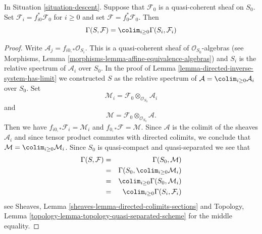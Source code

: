 \begin{lemma}
\label{lemma-descend-section}
In Situation \ref{situation-descent}.
Suppose that $\mathcal{F}_0$ is a quasi-coherent sheaf on $S_0$.
Set $\mathcal{F}_i = f_{i0}^*\mathcal{F}_0$ for $i \geq 0$ and set
$\mathcal{F} = f_0^*\mathcal{F}_0$.
Then
$$
\Gamma(S, \mathcal{F}) = \colim_{i \geq 0} \Gamma(S_i, \mathcal{F}_i)
$$
\end{lemma}

\begin{proof}
Write $\mathcal{A}_j = f_{i0, *} \mathcal{O}_{S_i}$.
This is a quasi-coherent sheaf of $\mathcal{O}_{S_0}$-algebras
(see Morphisms, Lemma \ref{morphisms-lemma-affine-equivalence-algebras})
and $S_i$ is the relative spectrum of $\mathcal{A}_i$ over $S_0$.
In the proof of Lemma \ref{lemma-directed-inverse-system-has-limit}
we constructed $S$ as the relative spectrum of
$\mathcal{A} = \colim_{i \geq 0} \mathcal{A}_i$
over $S_0$. Set
$$
\mathcal{M}_i = \mathcal{F}_0 \otimes_{\mathcal{O}_{S_0}} \mathcal{A}_i
$$
and
$$
\mathcal{M} = \mathcal{F}_0 \otimes_{\mathcal{O}_{S_0}} \mathcal{A}.
$$
Then we have $f_{i0, *} \mathcal{F}_i = \mathcal{M}_i$
and $f_{0, *}\mathcal{F} = \mathcal{M}$. Since $\mathcal{A}$
is the colimit of the sheaves $\mathcal{A}_i$ and since tensor
product commutes with directed colimits, we conclude that
$\mathcal{M} = \colim_{i \geq 0} \mathcal{M}_i$.
Since $S_0$ is quasi-compact and quasi-separated we see that
\begin{eqnarray*}
\Gamma(S, \mathcal{F})
& = &
\Gamma(S_0, \mathcal{M}) \\
& = &
\Gamma(S_0, \colim_{i \geq 0} \mathcal{M}_i) \\
& = &
\colim_{i \geq 0} \Gamma(S_0, \mathcal{M}_i) \\
& = &
\colim_{i \geq 0} \Gamma(S_i, \mathcal{F}_i)
\end{eqnarray*}
see Sheaves, Lemma \ref{sheaves-lemma-directed-colimits-sections} and
Topology, Lemma \ref{topology-lemma-topology-quasi-separated-scheme}
for the middle equality.
\end{proof}
